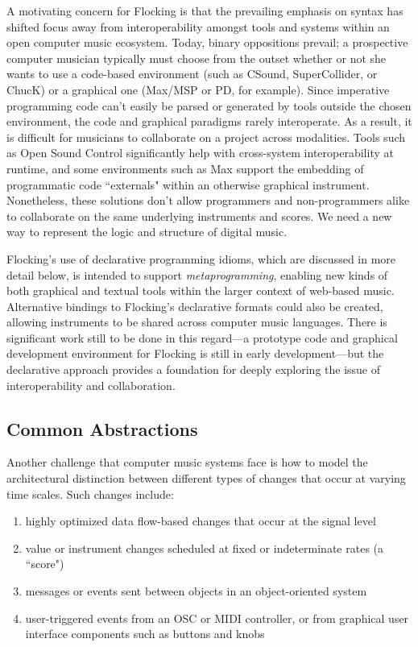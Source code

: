 \documentclass{article}
\begin{document}
A motivating concern for Flocking is that the prevailing emphasis on syntax has shifted focus away from interoperability amongst tools and systems within an open computer music ecosystem. Today, binary oppositions prevail; a prospective computer musician typically must choose from the outset whether or not she wants to use a code-based environment (such as CSound, SuperCollider, or ChucK) or a graphical one (Max/MSP or PD, for example). Since imperative programming code can't easily be parsed or generated by tools outside the chosen environment, the code and graphical paradigms rarely interoperate. As a result, it is difficult for musicians to collaborate on a project across modalities. Tools such as Open Sound Control \cite{wright1997open} significantly help with cross-system interoperability at runtime, and some environments such as Max support the embedding of programmatic code ``externals" within an otherwise graphical instrument. Nonetheless, these solutions don't allow programmers and non-programmers alike to collaborate on the same underlying instruments and scores. We need a new way to represent the logic and structure of digital music.

Flocking's use of declarative programming idioms, which are discussed in more detail below, is intended to support {\it metaprogramming}, enabling new kinds of both graphical and textual tools within the larger context of web-based music. Alternative bindings to Flocking's declarative formats could also be created, allowing instruments to be shared across computer music languages. There is significant work still to be done in this regard---a prototype code and graphical development environment for Flocking is still in early development---but the declarative approach provides a foundation for deeply exploring the issue of interoperability and collaboration.

\subsection{Common Abstractions}

Another challenge that computer music systems face is how to model the architectural distinction between different types of changes that occur at varying time scales. Such changes include:

\begin{enumerate}
\item highly optimized data flow-based changes that occur at the signal level
\item value or instrument changes scheduled at fixed or indeterminate rates (a ``score")
\item messages or events sent between objects in an object-oriented system
\item user-triggered events from an OSC or MIDI controller, or from graphical user interface components such as buttons and knobs
\end{enumerate}
\end{document}
